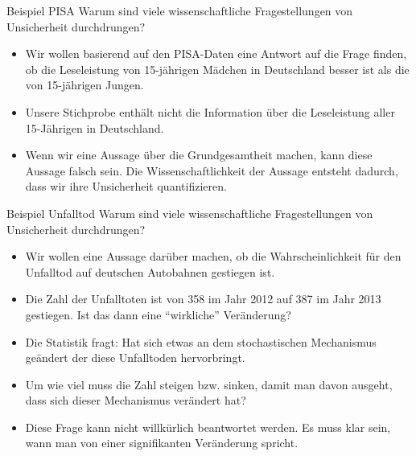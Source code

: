 \documentclass[usenames,dvipsnames,handout]{beamer}
\begin{document}
\begin{frame}{ Beispiel PISA }%
Warum sind viele wissenschaftliche Fragestellungen von Unsicherheit durchdrungen?
\begin{itemize}
\item{Wir wollen basierend auf den PISA-Daten  eine Antwort auf die Frage finden, ob die Leseleistung von 15-jährigen  Mädchen
in Deutschland besser ist als die von 15-jährigen  Jungen.}\pause
\item{Unsere Stichprobe enthält nicht die Information über die Leseleistung aller 15-Jährigen in Deutschland. }\pause
\item{Wenn wir eine Aussage über die Grundgesamtheit machen,
kann diese Aussage falsch sein. Die Wissenschaftlichkeit der Aussage entsteht dadurch, dass wir ihre Unsicherheit quantifizieren. }
\end{itemize}
\end{frame}
\begin{frame}{ Beispiel Unfalltod  }
Warum sind viele wissenschaftliche Fragestellungen von Unsicherheit durchdrungen?
\begin{itemize}
\item{Wir wollen eine Aussage darüber machen, ob die Wahrscheinlichkeit für den Unfalltod auf deutschen Autobahnen gestiegen ist.}\pause
\item{ Die Zahl der Unfalltoten ist von 358 im Jahr 2012 auf 387 im Jahr 2013 gestiegen. 
Ist das dann eine ``wirkliche'' Veränderung? }\pause
\item{Die Statistik fragt: Hat sich etwas an dem stochastischen Mechanismus geändert der diese Unfalltoden hervorbringt.}\pause
\item{Um wie viel muss die Zahl steigen bzw. sinken, damit man davon ausgeht, dass sich dieser Mechanismus verändert hat?}\pause
\item{Diese Frage kann nicht willkürlich beantwortet werden. Es muss klar sein, wann man von einer signifikanten Veränderung spricht.}
\end{itemize}
\end{frame}
\end{document}

